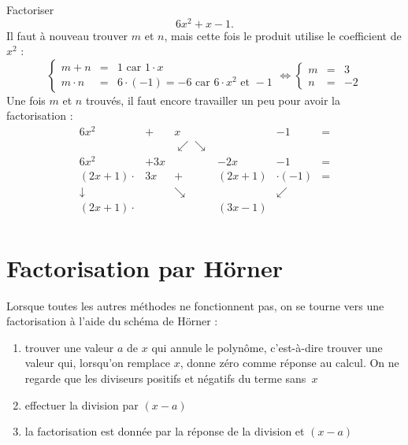 \begin{exemple}
Factoriser 
$$
6x^2 +x -1.
$$
Il faut à nouveau trouver $m$ et $n$, mais cette fois le produit utilise le coefficient de $x^2$ :
$$
\left\{
\begin{array}{lcl}
m+n &=& 1 \mbox{ car }1\cdot x  \\
m\cdot n &=& 6\cdot (-1) = -6 \mbox{ car } 6\cdot x^2 \mbox{ et } -1
\end{array}
\right.
\Leftrightarrow
\left\{
\begin{array}{lcl}
m &=& 3 \\
n &=& -2
\end{array}
\right.
$$
Une fois $m$ et $n$ trouvés, il faut encore travailler un peu pour avoir la factorisation :
$$
\begin{array}{cccccc}
6x^2& + & x && -1 &=\\
&&\swarrow\searrow &&&\\
6x^2 & +3x && -2x &-1 &=\\
(2x+1) \cdot & 3x & + & (2x+1)&\cdot (-1) &=\\
\downarrow &&\searrow&&\swarrow & \\
(2x+1) \cdot &&& (3x-1) && \\
\end{array}
$$
\end{exemple}

\section{Factorisation par Hörner}

Lorsque toutes les autres méthodes ne fonctionnent pas, on se tourne vers une factorisation à l'aide du schéma de Hörner :

\begin{enumerate}
\item trouver une valeur $a$ de $x$ qui annule le polynôme, c'est-à-dire trouver une valeur qui, lorsqu'on remplace $x$, donne zéro comme réponse au calcul. On ne regarde que les diviseurs positifs et négatifs du terme sans~$x$
\item effectuer la division par $(x-a)$
\item la factorisation est donnée par la réponse de la division et $(x-a)$
\end{enumerate}

